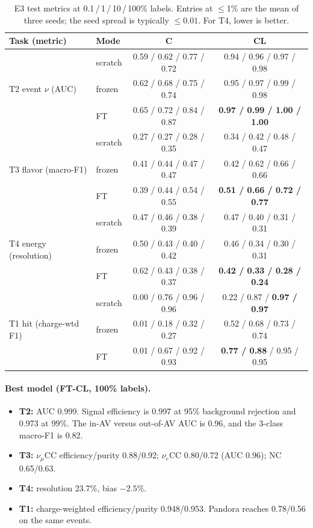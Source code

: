 \documentclass[11pt,a4paper]{article}
\newcommand{\nue}{\ensuremath{\nu_e}}
\newcommand{\numu}{\ensuremath{\nu_\mu}}
\newcommand{\best}[1]{\textbf{#1}}
\begin{document}
\begin{table}[h]
\centering\small
\caption{E3 test metrics at 0.1\,/\,1\,/\,10\,/\,100\% labels. Entries at $\le$1\% are the mean of three seeds; the seed spread is typically $\le 0.01$. For T4, lower is better.}
\label{tab:e3}
\begin{tabular}{llcc}
\toprule
Task (metric) & Mode & C & CL \\
\midrule
\multirow{3}{*}{T2 event $\nu$ (AUC)} & scratch & 0.59 / 0.62 / 0.77 / 0.72 & 0.94 / 0.96 / 0.97 / 0.98 \\
 & frozen & 0.62 / 0.68 / 0.75 / 0.74 & 0.95 / 0.97 / 0.99 / 0.98 \\
 & FT & 0.65 / 0.72 / 0.84 / 0.87 & \best{0.97 / 0.99 / 1.00 / 1.00} \\
\midrule
\multirow{3}{*}{T3 flavor (macro-F1)} & scratch & 0.27 / 0.27 / 0.28 / 0.35 & 0.34 / 0.42 / 0.48 / 0.47 \\
 & frozen & 0.41 / 0.44 / 0.47 / 0.47 & 0.42 / 0.62 / 0.66 / 0.66 \\
 & FT & 0.39 / 0.44 / 0.54 / 0.55 & \best{0.51 / 0.66 / 0.72 / 0.77} \\
\midrule
\multirow{3}{*}{T4 energy (resolution)} & scratch & 0.47 / 0.46 / 0.38 / 0.39 & 0.47 / 0.40 / 0.31 / 0.31 \\
 & frozen & 0.50 / 0.43 / 0.40 / 0.42 & 0.46 / 0.34 / 0.30 / 0.31 \\
 & FT & 0.62 / 0.43 / 0.38 / 0.37 & \best{0.42 / 0.33 / 0.28 / 0.24} \\
\midrule
\multirow{3}{*}{T1 hit (charge-wtd F1)} & scratch & 0.00 / 0.76 / 0.96 / 0.96 & 0.22 / 0.87 / \best{0.97 / 0.97} \\
 & frozen & 0.01 / 0.18 / 0.32 / 0.27 & 0.52 / 0.68 / 0.73 / 0.74 \\
 & FT & 0.01 / 0.67 / 0.92 / 0.93 & \best{0.77 / 0.88} / 0.95 / 0.95 \\
\bottomrule
\end{tabular}
\end{table}

\paragraph{Best model (FT-CL, 100\% labels).}
\begin{itemize}
  \item \textbf{T2:} AUC 0.999. Signal efficiency is 0.997 at 95\% background rejection and 0.973 at 99\%. The in-AV versus out-of-AV AUC is 0.96, and the 3-class macro-F1 is 0.82.
  \item \textbf{T3:} \numu CC efficiency/purity 0.88/0.92; \nue CC 0.80/0.72 (AUC 0.96); NC 0.65/0.63.
  \item \textbf{T4:} resolution 23.7\%, bias $-2.5\%$.
  \item \textbf{T1:} charge-weighted efficiency/purity 0.948/0.953. Pandora reaches 0.78/0.56 on the same events.
\end{itemize}
\end{document}
